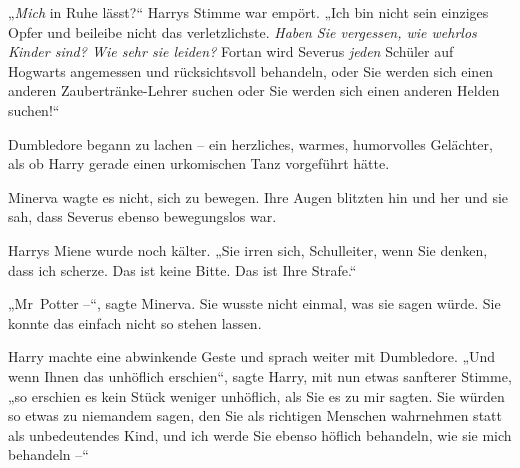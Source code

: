 „\emph{Mich} in Ruhe lässt?“ Harrys Stimme war empört. „Ich bin nicht sein einziges Opfer und beileibe nicht das verletzlichste. \emph{Haben Sie vergessen, wie wehrlos Kinder sind? Wie sehr sie leiden?} Fortan wird Severus \emph{jeden} Schüler auf Hogwarts angemessen und rücksichtsvoll behandeln, oder Sie werden sich einen anderen Zaubertränke-Lehrer suchen oder Sie werden sich einen anderen Helden suchen!“

Dumbledore begann zu lachen – ein herzliches, warmes, humorvolles Gelächter, als ob Harry gerade einen urkomischen Tanz vorgeführt hätte.

Minerva wagte es nicht, sich zu bewegen. Ihre Augen blitzten hin und her und sie sah, dass Severus ebenso bewegungslos war.

Harrys Miene wurde noch kälter. „Sie irren sich, Schulleiter, wenn Sie denken, dass ich scherze. Das ist keine Bitte. Das ist Ihre Strafe.“

„Mr~Potter –“, sagte Minerva. Sie wusste nicht einmal, was sie sagen würde. Sie konnte das einfach nicht so stehen lassen.

Harry machte eine abwinkende Geste und sprach weiter mit Dumbledore. „Und wenn Ihnen das unhöflich erschien“, sagte Harry, mit nun etwas sanfterer Stimme, „so erschien es kein Stück weniger unhöflich, als Sie es zu mir sagten. Sie würden so etwas zu niemandem sagen, den Sie als richtigen Menschen wahrnehmen statt als unbedeutendes Kind, und ich werde Sie ebenso höflich behandeln, wie sie mich behandeln –“

